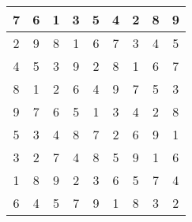 \documentclass[]{article}
\begin{document}
\vspace{1cm}

\bgroup
\def\arraystretch{2}
\begin{tabular}{c|c|c|c|c|c|c|c|c}
7 & 6 & 1 & 3 & 5 & 4 & 2 & 8 & 9 \\\hline
2 & 9 & 8 & 1 & 6 & 7 & 3 & 4 & 5 \\\hline
4 & 5 & 3 & 9 & 2 & 8 & 1 & 6 & 7 \\\hline
8 & 1 & 2 & 6 & 4 & 9 & 7 & 5 & 3 \\\hline
9 & 7 & 6 & 5 & 1 & 3 & 4 & 2 & 8 \\\hline
5 & 3 & 4 & 8 & 7 & 2 & 6 & 9 & 1 \\\hline
3 & 2 & 7 & 4 & 8 & 5 & 9 & 1 & 6 \\\hline
1 & 8 & 9 & 2 & 3 & 6 & 5 & 7 & 4 \\\hline
6 & 4 & 5 & 7 & 9 & 1 & 8 & 3 & 2 
\end{tabular}
\egroup

\vspace{1cm}
\end{document}

